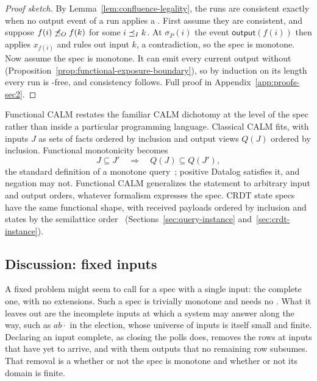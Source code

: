 \begin{proof}[Proof sketch]
By Lemma~\ref{lem:confluence-legality}, the runs are consistent exactly when
no output event of a run applies a \commitment.  First assume they are
consistent, and suppose $f(i)\not\preceq_O f(k)$ for some $i\preceq_I k$.  At
$\sigma_P(i)$ the event $\mathsf{output}(f(i))$ then applies $x_{f(i)}$ and
rules out input $k$, a contradiction, so the spec is monotone.  Now assume the
spec is monotone.  It can emit every current output without \commitment
(Proposition~\ref{prop:functional-exposure-boundary}), so by induction on its
length every run is \commitment-free, and consistency follows.  Full proof in
Appendix~\ref{app:proofs-sec2}.
\end{proof}

Functional CALM restates the familiar CALM dichotomy at the level of the spec
rather than inside a particular programming language.
Classical CALM fits, with inputs $J$ as sets of facts ordered by
inclusion and output views $Q(J)$ ordered by inclusion.  Functional
monotonicity becomes
        \begin{equation}
  J\subseteq J'
  \quad\Longrightarrow\quad
  Q(J)\subseteq Q(J'),
  \label{eq:query-monotonicity}
        \end{equation}
the standard definition of a monotone query~\cite{abiteboul1995foundations};
positive Datalog satisfies it, and negation may not.  Functional CALM
generalizes the statement to arbitrary input and
output orders, whatever formalism expresses the spec.  CRDT state specs have the same functional shape, with received payloads ordered by inclusion and states by the semilattice order~\cite{shapiro2011crdt} (Sections~\ref{sec:query-instance}
and~\ref{sec:crdt-instance}).

\subsection{Discussion: fixed inputs}
\label{sec:fixed-inputs}

A fixed problem might seem to call for a spec with a single input: the
complete one, with no extensions.  Such a spec is trivially monotone and needs
no \commitment.  What it leaves out are the incomplete inputs at which a system
may answer along the way, such as $ab\cdot$ in the election, whose universe of
inputs is itself small and finite.  Declaring an input complete, as closing
the polls does, removes the rows at inputs that have yet to arrive, and with
them outputs that no remaining row subsumes.  That removal is a \commitment
whether or not the spec is monotone and whether or not its domain is finite.
